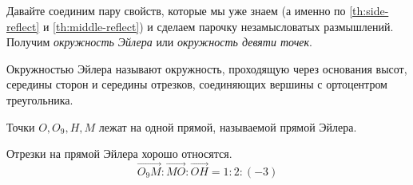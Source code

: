 Давайте соединим пару свойств, которые мы уже знаем (а именно по \cref{th:side-reflect} и \cref{th:middle-reflect}) и сделаем парочку незамысловатых размышлений. Получим \emph{окружность Эйлера} или \emph{окружность девяти точек}.
\begin{definition}\label{def:euler's circle}
    Окружностью Эйлера называют окружность, проходящую через основания высот, середины сторон и середины отрезков, соединяющих вершины с ортоцентром треугольника.
\end{definition}
\begin{definition}\label{def:euler's line}
    Точки $O, O_9, H, M$ лежат на одной прямой, называемой прямой Эйлера.
\end{definition}
\begin{theorem} \label{th:euler's line ratios}
    Отрезки на прямой Эйлера хорошо относятся.\[\overrightarrow{O_9M} : \overrightarrow{MO}: \overrightarrow{OH} = 1 : 2 : (-3)\]
\end{theorem}

